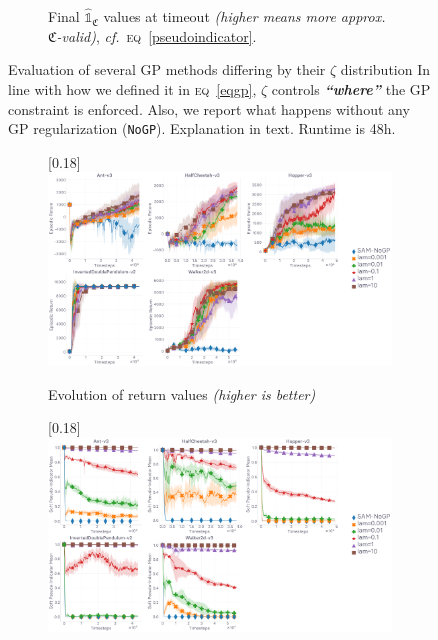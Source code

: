 \begin{figure}
\begin{subfigure}[t]{0.99\textwidth}
    \caption{Final $\widehat{\mathds{1}}_\mathfrak{C}$ values at timeout
    \textit{(higher means more approx. $\mathfrak{C}$-valid)}, \textit{cf.}~\textsc{eq}~\ref{pseudoindicator}.}
  \end{subfigure}
  \caption{
  Evaluation of several GP methods differing by their $\zeta$ distribution
  In line with how we defined it in \textsc{eq}~\ref{eqgp},
  $\zeta$ controls \textbf{\emph{``where''}} the GP constraint is enforced.
  Also, we report what happens without any GP regularization (\texttt{NoGP}).
  Explanation in text.
  Runtime is 48h.}
  \label{pseudoindicatorempzeta}
\end{figure}

\begin{figure}
  \center
  \begin{subfigure}[t]{0.99\textwidth}
    \center\scalebox{0.18}[0.18]{\includegraphics{Plots/gs_lambda_5envs/plots_eval_env_ret_plot.pdf}}
    \caption{Evolution of return values \textit{(higher is better)}}
    \label{pseudoindicatoremplambdaret}
  \end{subfigure}
  \begin{subfigure}[t]{0.99\textwidth}
    \center\scalebox{0.18}[0.18]{\includegraphics{Plots/gs_lambda_5envs/plots_mod_1_plot.pdf}}

\end{subfigure}
\end{figure}
